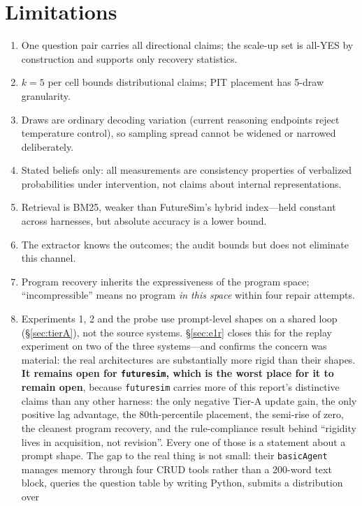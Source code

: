 \documentclass[10pt]{article}
\newcommand{\hr}[1]{\texttt{#1}}
\begin{document}
\section{Limitations}\label{sec:limits}
\begin{enumerate}
\item One question pair carries all directional claims; the scale-up set is all-YES by
construction and supports only recovery statistics.
\item $k{=}5$ per cell bounds distributional claims; PIT placement has 5-draw granularity.
\item Draws are ordinary decoding variation (current reasoning endpoints reject temperature
control), so sampling spread cannot be widened or narrowed deliberately.
\item Stated beliefs only: all measurements are consistency properties of verbalized
probabilities under intervention, not claims about internal representations.
\item Retrieval is BM25, weaker than FutureSim's hybrid index---held constant across harnesses,
but absolute accuracy is a lower bound.
\item The extractor knows the outcomes; the audit bounds but does not eliminate this channel.
\item Program recovery inherits the expressiveness of the program space; ``incompressible'' means
no program \emph{in this space} within four repair attempts.
\item Experiments 1, 2 and the probe use prompt-level shapes on a shared loop
(\S\ref{sec:tierA}), not the source systems. \S\ref{sec:e1r} closes this for the replay
experiment on two of the three systems---and confirms the concern was material: the real
architectures are substantially more rigid than their shapes. \textbf{It remains open for
\hr{futuresim}, which is the worst place for it to remain open}, because \hr{futuresim} carries
more of this report's distinctive claims than any other harness: the only negative Tier-A update
gain, the only positive lag advantage, the 80th-percentile placement, the semi-rise of zero, the
cleanest program recovery, and the rule-compliance result behind ``rigidity lives in acquisition,
not revision''. Every one of those is a statement about a prompt shape. The gap to the real thing
is not small: their \texttt{basicAgent} manages memory through four CRUD tools rather than a
200-word text block, queries the question table by writing Python, submits a distribution over

\end{enumerate}
\end{document}
